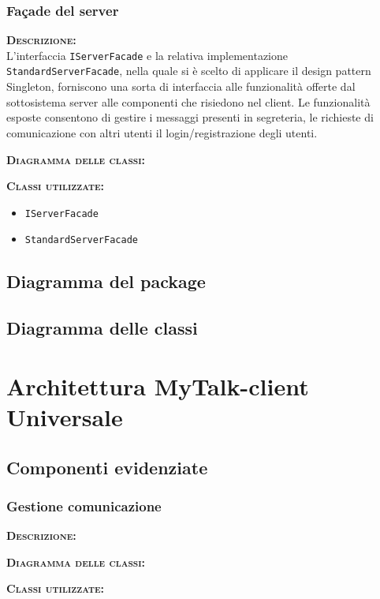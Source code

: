 \subsubsection{Façade del server}
\begin{description}
	\item{\scshape\bfseries Descrizione:}\\
L'interfaccia \texttt{IServerFacade} e la relativa implementazione \texttt{StandardServerFacade}, nella quale si è scelto di applicare il design pattern Singleton, forniscono una sorta di interfaccia alle funzionalità offerte dal sottosistema server alle componenti che risiedono nel client. Le funzionalità esposte consentono di gestire i messaggi presenti in segreteria, le richieste di comunicazione con altri utenti il login/registrazione degli utenti.
	\item{\scshape\bfseries Diagramma delle classi:}
	\item{\scshape\bfseries Classi utilizzate:}\\
\begin{itemize}
  \item \texttt{IServerFacade}
  \item \texttt{StandardServerFacade}
\end{itemize}
\end{description}

\subsection{Diagramma del package}

\subsection{Diagramma delle classi}
\clearpage

\section{Architettura MyTalk-client Universale}

\subsection{Componenti evidenziate}
\subsubsection{Gestione comunicazione}
\begin{description}
	\item{\scshape\bfseries Descrizione:} 
	\item{\scshape\bfseries Diagramma delle classi:}
	\item{\scshape\bfseries Classi utilizzate:} 
\end{description}

